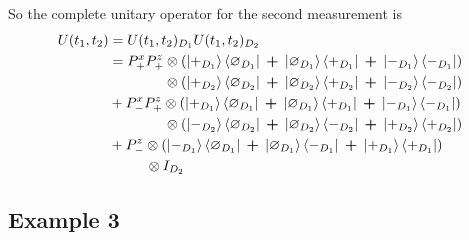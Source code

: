 So the complete unitary operator for the second measurement is
\begin{align}
  U(t_1, t_2) &= U(t_1, t_2)_{D_1} U(t_1, t_2)_{D_2} \\ \nonumber
  &= P^x_+ P^z_+ \otimes \left(\ket{+_{D_1}}\bra{\varnothing_{D_1}} \: \bm{+} \: \ket{\varnothing_{D_1}}\bra{+_{D_1}} \: \bm{+} \: \ket{-_{D_1}}\bra{-_{D_1}} \right) \\ \nonumber
  & \phantom{{} = P^x_+ P^z_+} \otimes  \left(\ket{+_{D_2}}\bra{\varnothing_{D_2}} \: \bm{+} \: \ket{\varnothing_{D_2}}\bra{+_{D_2}} \: \bm{+} \: \ket{-_{D_2}}\bra{-_{D_2}} \right) \\ \nonumber
  &+ P^x_- P^z_+ \otimes \left(\ket{+_{D_1}}\bra{\varnothing_{D_1}} \: \bm{+} \: \ket{\varnothing_{D_1}}\bra{+_{D_1}} \: \bm{+} \: \ket{-_{D_1}}\bra{-_{D_1}} \right) \\ \nonumber
  & \phantom{{} = P^x_+ P^z_+} \otimes  \left(\ket{-_{D_2}}\bra{\varnothing_{D_2}} \: \bm{+} \: \ket{\varnothing_{D_2}}\bra{-_{D_2}} \: \bm{+} \: \ket{+_{D_2}}\bra{+_{D_2}} \right) \\ \nonumber
  &+ P^z_- \otimes \left(\ket{-_{D_1}}\bra{\varnothing_{D_1}} \: \bm{+} \: \ket{\varnothing_{D_1}}\bra{-_{D_1}} \: \bm{+} \: \ket{+_{D_1}}\bra{+_{D_1}} \right) \\ \nonumber
  & \phantom{{}={}P^z_+} \otimes I_{D_2}
\end{align}

\subsection{Example 3}


